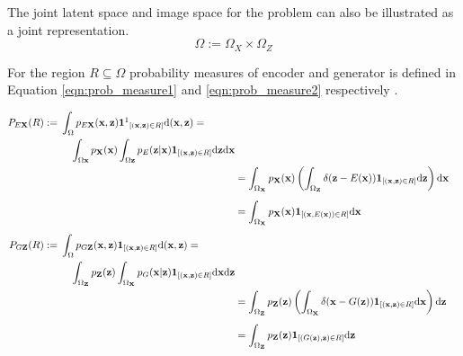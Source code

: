 The joint latent space and image space for the problem can also be illustrated as a joint
representation.
$$
\Omega := \Omega_{X} \times \Omega_{Z}
$$

For the region $R \subseteq \Omega$ probability
measures \cite{RePEc:eee:csdana:v:20:y:1995:i:6:p:703-702} of encoder and generator is defined in
Equation \ref{eqn:prob_measure1} and \ref{eqn:prob_measure2} respectively \cite{Donahue2017AdversarialFL}.

 \begin{align}
    \begin{split}\label{eqn:prob_measure1}
    P_{E \mathbf{X}}(R)  :={}&\int_{\Omega} p_{E \mathbf{X}}(\mathbf{x}, \mathbf{z})
    \mathbf{1\footnotemark}_{[(\mathbf{x}, \mathbf{z}) \in R]} \mathrm{d}(\mathbf{x}, \mathbf{z})= \\ 
    & \quad \int_{\Omega \mathbf{x}} p_{\mathbf{X}}(\mathbf{x}) \int_{\Omega \mathbf{z}} p_{E}(\mathbf{z} | \mathbf{x})
    \mathbf{1}_{[(\mathbf{x}, \mathbf{z}) \in R]} \mathrm{d} \mathbf{z} \mathrm{d} \mathbf{x}       
    \end{split}\\
    {}&=\int_{\Omega_{\mathbf{X}}} p_{\mathbf{X}}(\mathbf{x})\left(\int_{\Omega_{\mathbf{Z}}} \delta(\mathbf{z}-E(\mathbf{x})) \mathbf{1}_{[(\mathbf{x}, \mathbf{z}) \in R]} \mathrm{d} \mathbf{z}\right) \mathrm{d} \mathbf{x} \\[5pt]
    {}& =\int_{\Omega_{\mathbf{X}}} p_{\mathbf{X}}(\mathbf{x}) \mathbf{1}_{[(\mathbf{x}, E(\mathbf{x})) \in R]} \mathrm{d} \mathbf{x} \\[5pt]
    \begin{split}\label{eqn:prob_measure2}
    P_{G \mathbf{Z}}(R) :={}&\int_{\Omega} p_{G \mathbf{Z}}(\mathbf{x}, \mathbf{z}) 
    \mathbf{1}_{[(\mathbf{x},\mathbf{z}) \in R]} \mathrm{d}(\mathbf{x}, \mathbf{z})= \\ 
    & \quad \int_{\Omega_{\mathbf{Z}}} p_{\mathbf{Z}}(\mathbf{z}) \int_{\Omega_{\mathbf{X}}} p_{G}(\mathbf{x} | \mathbf{z})
    \mathbf{1}_{[(\mathbf{x}, \mathbf{z}) \in R]} \mathrm{d} \mathbf{x} \mathrm{d} \mathbf{z} 
    \end{split}\\
    {}&=\int_{\Omega_{\mathbf{Z}}} p_{\mathbf{Z}}(\mathbf{z})\left(\int_{\Omega_{\mathbf{X}}} \delta(\mathbf{x}-G(\mathbf{z})) \mathbf{1}_{[(\mathbf{x}, \mathbf{z}) \in R]} \mathrm{d} \mathbf{x}\right) \mathrm{d} \mathbf{z} \\[5pt]
    {}& =\int_{\Omega_{\mathbf{Z}}} p_{\mathbf{Z}}(\mathbf{z}) \mathbf{1}_{[(G(\mathbf{z}), \mathbf{z}) \in R]} \mathrm{d} \mathbf{z}
\end{align}        


